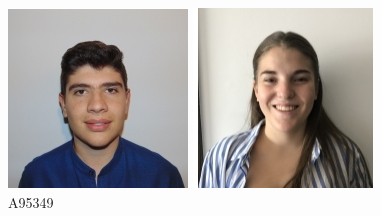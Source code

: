 \documentclass[11pt]{article}
\begin{document}
\begin{titlepage}
\begin{center}
        \begin{figure}[hbt!]
            \includegraphics[width=\linewidth]{Imagens/febras.png}
            \centering
            \caption{A95349}
        \endminipage\hfill
            \includegraphics[width=\linewidth]{Imagens/Photo (2).jpg}

\end{figure}
\end{center}
\end{titlepage}
\end{document}
